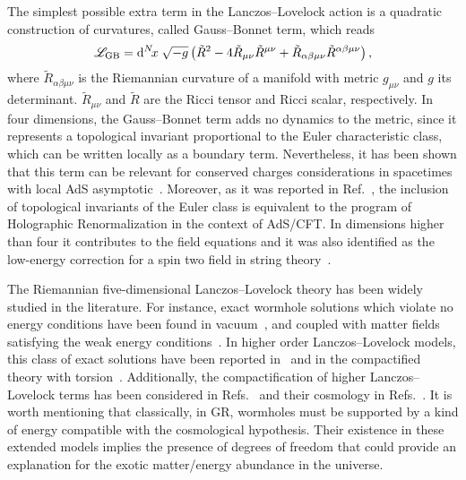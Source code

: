 \documentclass[aps,prd,12pt,superscriptaddress,showpacs,showkeys,longbibliography,reprint,nofootinbib]{revtex4-1}
\begin{document}
The simplest possible extra term in the Lanczos--Lovelock action  is a quadratic construction of curvatures, called Gauss--Bonnet term, which reads
\begin{equation}\label{GB}
  \mathcal{L}_{\mathrm{GB}} = {\mathrm{d}}^{N}\!{x}\;\sqrt{-g}\left(\tilde{R}^2-4\tilde{R}_{\mu\nu}\tilde{R}^{\mu\nu}+\tilde{R}_{\alpha\beta\mu\nu}
  \tilde{R}^{\alpha\beta\mu\nu}\right),
\end{equation}
where $\tilde{R}_{\alpha\beta\mu\nu}$ is the Riemannian curvature of a
manifold with metric $g_{\mu\nu}$ and $g$ its
determinant. $\tilde{R}_{\mu\nu}$ and $\tilde{R}$ are the Ricci tensor
and Ricci scalar, respectively. In four dimensions, the Gauss--Bonnet
term adds no dynamics to the metric, since it represents a topological
invariant proportional to the Euler characteristic class, which can be
written locally as a boundary term. Nevertheless, it has been shown
that this term can be relevant for conserved charges considerations in
spacetimes with local AdS asymptotic~\cite{Aros:1999id}. Moreover, as
it was reported in Ref.~\cite{Miskovic:2009bm}, the inclusion of
topological invariants of the Euler class is equivalent to the program
of Holographic Renormalization in the context of AdS/CFT. In
dimensions higher than four it contributes to the field equations and
it was also identified as the low-energy correction for a spin two
field in string theory~\cite{Zwiebach:1985uq}.

The Riemannian five-dimensional Lanczos--Lovelock theory has been
widely studied in the literature. For instance, exact wormhole
solutions which violate no energy conditions have been found in
vacuum~\cite{Dotti:2006cp,*Dotti:2007az}, and coupled with matter
fields satisfying the weak energy
conditions~\cite{Mehdizadeh:2015jra}. In higher order
Lanczos--Lovelock models, this class of exact solutions have been
reported in~\cite{Mehdizadeh:2015dta} and in the compactified theory
with torsion~\cite{Canfora:2008ka}. Additionally, the compactification
of higher Lanczos--Lovelock terms has been considered in
Refs.~\cite{MuellerHoissen:1985mm,*MuellerHoissen:1989yv} and their
cosmology in
Refs.~\cite{MuellerHoissen:1985ij,Deruelle:1986iv,Deruelle:1989fj}. It
is worth mentioning that classically, in GR, wormholes must be supported by
a kind of energy compatible with the cosmological hypothesis. Their
existence in these extended models implies the presence of degrees of
freedom that could provide an explanation for the exotic matter/energy
abundance in the universe.
\end{document}
